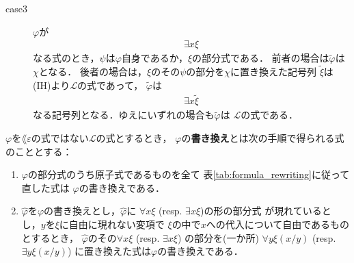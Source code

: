 \begin{metaprf}
\begin{description}
\begin{description}
					\item[case3] $\varphi$が
						\begin{align}
							\exists x \xi
						\end{align}
						なる式のとき，$\psi$は$\varphi$自身であるか，$\xi$の部分式である．
						前者の場合は$\widetilde{\varphi}$は$\chi$となる．
						後者の場合は，$\xi$のその$\psi$の部分を$\chi$に置き換えた記号列
						$\widetilde{\xi}$は(IH)より$\mathcal{L}$の式であって，
						$\widetilde{\varphi}$は
						\begin{align}
							\exists x \widetilde{\xi}
						\end{align}
						なる記号列となる．ゆえにいずれの場合も$\widetilde{\varphi}$は
						$\mathcal{L}$の式である．
						\QED
				\end{description}
		\end{description}
	\end{metaprf}
	
	\begin{screen}
		\begin{metadfn}[式の書き換え]
			$\varphi$を$\lang{\varepsilon}$の式ではない$\mathcal{L}$の式とするとき，
			$\varphi$の{\bf 書き換え}とは次の手順で得られる式のこととする：
			\begin{enumerate}
				\item $\varphi$の部分式のうち原子式であるものを全て
					表\ref{tab:formula_rewriting}に従って直した式は
					$\varphi$の書き換えである．
					
				\item $\widehat{\varphi}$を$\varphi$の書き換えとし，$\widehat{\varphi}$に
					$\forall x \xi$ (resp. $\exists x \xi$)の形の部分式\footnotemark
					が現れているとし，$y$を$\xi$に自由に現れない変項で
					$\xi$の中で$x$への代入について自由であるものとするとき，
					$\widehat{\varphi}$のその$\forall x \xi$ (resp. $\exists x \xi$)
					の部分を(一か所) $\forall y \xi(x/y)$ (resp. $\exists y \xi(x/y)$)
					に置き換えた式は$\varphi$の書き換えである．
			\end{enumerate}
		\end{metadfn}
	\end{screen}
	
	
